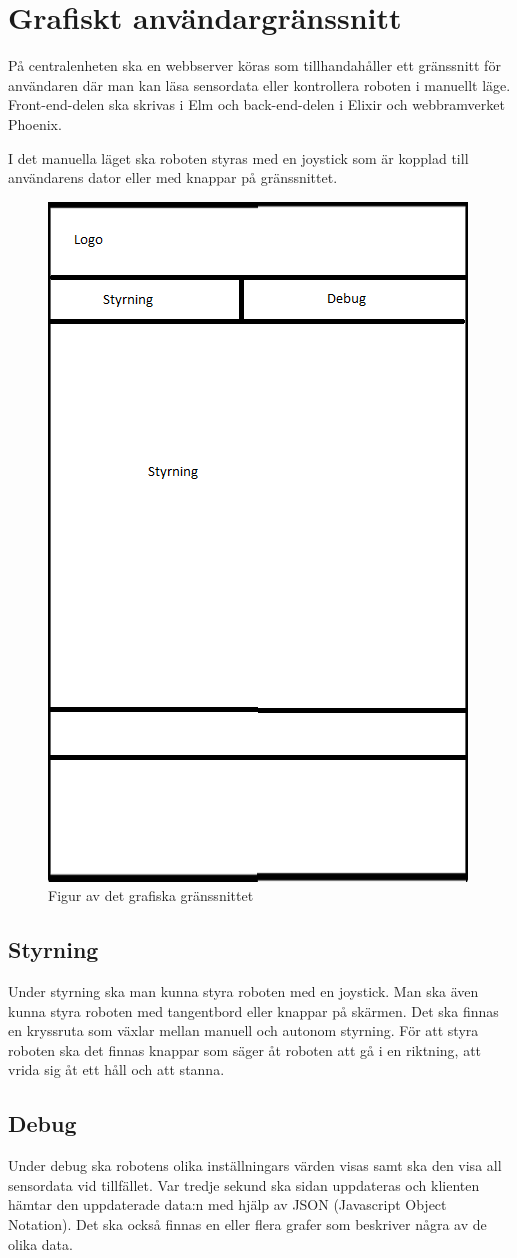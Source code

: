 \documentclass[a4paper,titlepage,12pt]{article}
\begin{document}
	\section{Grafiskt användargränssnitt}
	På centralenheten ska en webbserver köras som tillhandahåller ett gränssnitt
	för användaren där man kan läsa sensordata eller kontrollera roboten i
	manuellt läge. Front-end-delen ska skrivas i Elm och back-end-delen i Elixir
    och webbramverket Phoenix.

	I det manuella läget ska roboten styras med en joystick som är kopplad till användarens
	dator eller med knappar på gränssnittet.
	
	\begin{figure}[h]
		\centering
		\includegraphics[width=0.5\linewidth]{images/gui-index.png}
		\caption{Figur av det grafiska gränssnittet\label{fig:gui-overview}}
	\end{figure}
    
    \subsection{Styrning}
    Under styrning ska man kunna styra roboten med en joystick. Man ska även
    kunna styra roboten med tangentbord eller knappar på skärmen. Det ska finnas
    en kryssruta som växlar mellan manuell och autonom styrning. För att styra
    roboten ska det finnas knappar som säger åt roboten att gå i en riktning,
    att vrida sig åt ett håll och att stanna.

    \subsection{Debug}
	Under debug ska robotens olika inställningars värden visas samt ska den visa all 
	sensordata vid tillfället. Var tredje sekund ska sidan uppdateras och klienten 
	hämtar den uppdaterade data:n med hjälp av JSON (Javascript Object Notation). 
	Det ska också finnas en eller flera grafer som beskriver några av de olika data.
\end{document}
